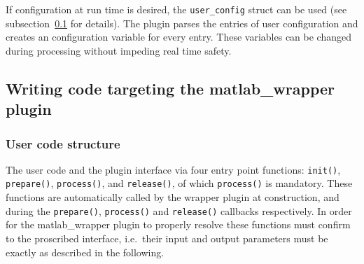 \documentclass[11pt,a4paper,twoside]{article}
\newcommand{\+}{\discretionary{\mbox{\scriptsize$\hookleftarrow$}}{}{}}
\begin{document}
If configuration at run time is desired, the \texttt{user\_config}
struct can be used (see subsection~\ref{subsec:writing_code} for details).
The plugin parses the entries of user configuration and creates an
\mha{} configuration variable for every entry. These variables can be
changed during processing without impeding real time safety.

\subsection{Writing code targeting the matlab\_wrapper plugin}\label{subsec:writing_code}
\subsubsection{User code structure}
The user code and the plugin interface via four entry point functions:
\texttt{init()}, \texttt{prepare()}, \texttt{process()}, and \texttt{release()}, of which \texttt{process()} is mandatory.
These functions are automatically called by the wrapper plugin at construction, and during the \texttt{prepare()},
\texttt{process()} and \texttt{release()} callbacks respectively.
In order for the matlab\_wrapper plugin to properly resolve these functions must confirm to the proscribed interface,
i.e.\ their input and output parameters must be exactly as described in the following.\\
\end{document}
